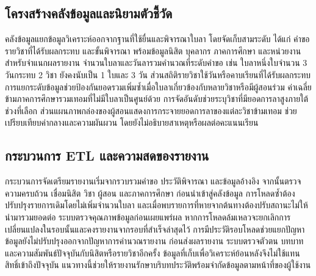 \subsection{โครงสร้างคลังข้อมูลและนิยามตัวชี้วัด}
คลังข้อมูลแยกข้อมูลวิเคราะห์ออกจากฐานที่ใช้ยื่นและพิจารณาใบลา
โดยจัดเก็บสามระดับ ได้แก่ คำขอ รายวิชาที่ได้รับผลกระทบ และขั้นพิจารณา
พร้อมข้อมูลนิสิต บุคลากร ภาคการศึกษา และหน่วยงานสำหรับจำแนกผลรายงาน
\cite{warehouse}
จำนวนใบลาและวันลารวมคำนวณที่ระดับคำขอ เช่น ใบลาหนึ่งใบจำนวน 3
วันกระทบ 2 วิชา ยังคงนับเป็น 1 ใบและ 3 วัน
ส่วนสถิติรายวิชาใช้วันหรือคาบเรียนที่ได้รับผลกระทบ
การแยกระดับข้อมูลช่วยป้องกันยอดรวมเพิ่มซ้ำเมื่อใบลาเกี่ยวข้องกับหลายวิชาหรือมีผู้สอนร่วม
ค่าเฉลี่ยข้ามภาคการศึกษารวมเทอมที่ไม่มีใบลาเป็นศูนย์ด้วย
การจัดอันดับช่วยระบุวิชาที่มียอดการลาสูงภายใต้ช่วงที่เลือก
ส่วนแผนภาพกล่องของผู้สอนแสดงการกระจายยอดการลาของแต่ละวิชาข้ามเทอม
ช่วยเปรียบเทียบค่ากลางและความผันผวน โดยยังไม่อธิบายสาเหตุหรือผลต่อคะแนนเรียน
\subsection{กระบวนการ ETL และความสดของรายงาน}
กระบวนการจัดเตรียมรายงานเริ่มจากรวบรวมคำขอ ประวัติพิจารณา
และข้อมูลอ้างอิง จากนั้นตรวจความครบถ้วน เชื่อมนิสิต วิชา ผู้สอน
และภาคการศึกษา ก่อนนำเข้าสู่คลังข้อมูล
การโหลดซ้ำต้องปรับปรุงรายการเดิมโดยไม่เพิ่มจำนวนใบลา
และเมื่อพบรายการที่หายจากต้นทางต้องปรับสถานะไม่ให้นำมารวมยอดต่อ
ระบบตรวจคุณภาพข้อมูลก่อนเผยแพร่ผล
หากการโหลดล้มเหลวจะยกเลิกการเปลี่ยนแปลงในรอบนั้นและคงรายงานจากรอบที่สำเร็จล่าสุดไว้
การมีประวัติรอบโหลดช่วยแยกปัญหาข้อมูลยังไม่ปรับปรุงออกจากปัญหาการคำนวณรายงาน
ก่อนส่งผลรายงาน ระบบตรวจตัวตน บทบาท
และความสัมพันธ์ปัจจุบันกับนิสิตหรือรายวิชาอีกครั้ง
ข้อมูลที่เก็บเพื่อวิเคราะห์ย้อนหลังจึงไม่ใช้แทนสิทธิ์เข้าถึงปัจจุบัน
แนวทางนี้ช่วยให้รายงานรักษาบริบทประวัติพร้อมจำกัดข้อมูลตามหน้าที่ของผู้ใช้งาน
